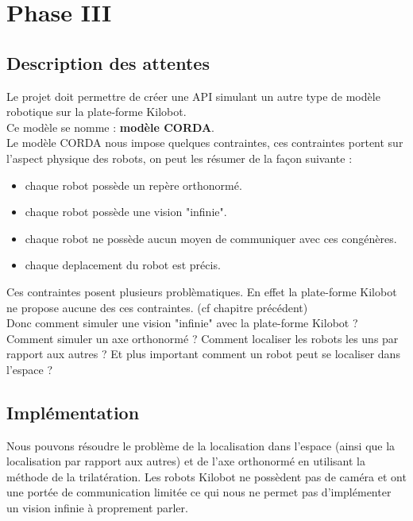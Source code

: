 \documentclass[a4paper,8pt]{report}
\begin{document}
\chapter{Phase III}

\section*{Description des attentes}\label{sec:name}

Le projet doit permettre de cr\'eer une API simulant un autre type de mod\`ele robotique sur la plate-forme Kilobot.\\
Ce mod\`ele se nomme : \textbf{mod\`ele CORDA}.\\
Le mod\`ele CORDA nous impose quelques contraintes, ces contraintes portent sur l'aspect physique des robots, on peut les r\'esumer de la fa\c con suivante : \\

\begin{itemize}
\item chaque robot poss\`ede un rep\`ere orthonorm\'e.
\item chaque robot poss\`ede une vision "infinie".
\item chaque robot ne poss\`ede aucun moyen de communiquer avec ces cong\'en\`eres.
\item chaque deplacement du robot est pr\'ecis.
\end{itemize}

\medskip
Ces contraintes posent plusieurs probl\`ematiques. En effet la plate-forme Kilobot ne propose aucune des ces contraintes. (cf chapitre pr\'ec\'edent)\\
Donc comment simuler une vision "infinie" avec la plate-forme Kilobot ? Comment simuler un axe orthonorm\'e ? Comment localiser les robots les uns par rapport aux autres ? Et plus important comment un robot peut se localiser dans l'espace ?\\


\section*{Impl\'ementation}\label{sec:name}

Nous pouvons r\'esoudre le probl\`eme de la localisation dans l'espace (ainsi que la localisation par rapport aux autres) et de l'axe orthonorm\'e en utilisant la m\'ethode de la trilat\'eration. Les robots Kilobot ne poss\`edent pas de cam\'era et ont une port\'ee de communication limit\'ee ce qui nous ne permet pas d'impl\'ementer un vision infinie \`a proprement parler.\\
\end{document}
